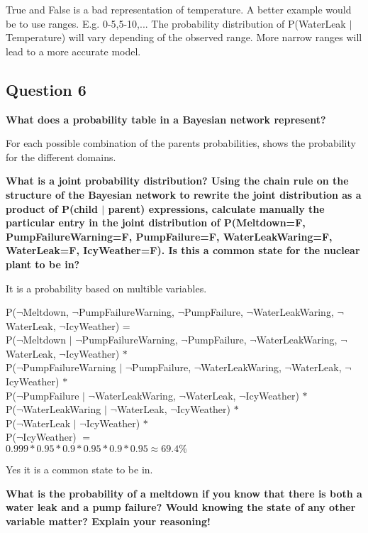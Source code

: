 \documentclass[12pt,a4paper]{article}
\begin{document}
True and False is a bad representation of temperature. A better example would be to use ranges. E.g. 0-5,5-10,... The probability distribution of P(WaterLeak $|$ Temperature) will vary depending of the observed range. More narrow ranges will lead to a more accurate model.

\subsection{Question 6}
\textbf{What does a probability table in a Bayesian network represent?}

For each possible combination of the parents probabilities, shows the probability for the different domains.

\textbf{What is a joint probability distribution? Using the chain rule on the structure of the Bayesian network to rewrite the joint distribution as a product of P(child $|$ parent) expressions, calculate manually the particular entry in the joint distribution of P(Meltdown=F, PumpFailureWarning=F, PumpFailure=F, WaterLeakWaring=F, WaterLeak=F, IcyWeather=F). Is this a common state for the nuclear plant to be in?}

It is a probability based on multible variables.

P($\lnot$Meltdown, $\lnot$PumpFailureWarning, $\lnot$PumpFailure, $\lnot$WaterLeakWaring, $\lnot$WaterLeak, $\lnot$IcyWeather) = \\ P($\lnot$Meltdown $|$ $\lnot$PumpFailureWarning, $\lnot$PumpFailure, $\lnot$WaterLeakWaring, $\lnot$WaterLeak, $\lnot$IcyWeather) $*$ \\ P($\lnot$PumpFailureWarning $|$ $\lnot$PumpFailure, $\lnot$WaterLeakWaring, $\lnot$WaterLeak, $\lnot$IcyWeather) $*$ \\ P($\lnot$PumpFailure $|$ $\lnot$WaterLeakWaring, $\lnot$WaterLeak, $\lnot$IcyWeather) $*$ \\ P($\lnot$WaterLeakWaring $|$ $\lnot$WaterLeak, $\lnot$IcyWeather) $*$ \\
P($\lnot$WaterLeak $|$ $\lnot$IcyWeather) $*$ \\ P($\lnot$IcyWeather) $=$ \\
$0.999 * 0.95 * 0.9 * 0.95 * 0.9 * 0.95 \approx 69.4\%$

Yes it is a common state to be in.

\textbf{What is the probability of a meltdown if you know that there is both a water leak and a pump failure? Would knowing the state of any other variable matter? Explain your reasoning!}
\end{document}

